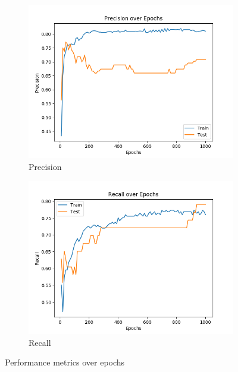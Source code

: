 \documentclass[11pt,a4paper]{article}
\begin{document}
\begin{figure}[htbp]
\begin{subfigure}{\columnwidth}
  \includegraphics[width=\columnwidth,keepaspectratio]{precision.png}
  \caption{Precision}
  \label{fig:perform-graph:prec}
\end{subfigure}
\begin{subfigure}{\columnwidth}
  \centering
  \includegraphics[width=\columnwidth,keepaspectratio]{recall.png}
  \caption{Recall}
  \label{fig:perform-graph:rec}
\end{subfigure}
\caption{Performance metrics over epochs}
\label{fig:perform-graph}
\end{figure}
\end{document}
